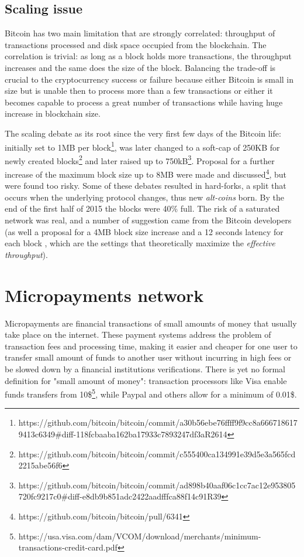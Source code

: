 		\subsection{Scaling issue}
		
		Bitcoin has two main limitation that are strongly correlated: throughput of transactions processed and disk space occupied from the blockchain. The correlation is trivial: as long as a block holds more transactions, the throughput increases and the same does the size of the block. Balancing the trade-off is crucial to the cryptocurrency success or failure because either Bitcoin is small in size but is unable then to process more than a few transactions or either it becomes capable to process a great number of transactions while having huge increase in blockchain size. 
		
		The scaling debate as its root since the very first few days of the Bitcoin life: initially set to 1MB per block\footnote{https://github.com/bitcoin/bitcoin/commit/a30b56ebe76ffff9f9cc8a6667186179413c6349\#diff-118fcbaaba162ba17933c7893247df3aR2614}, was later changed to a soft-cap of 250KB for newly created blocks\footnote{https://github.com/bitcoin/bitcoin/commit/c555400ca134991e39d5e3a565fcd2215abe56f6} and later raised up to 750kB\footnote{https://github.com/bitcoin/bitcoin/commit/ad898b40aaf06c1cc7ac12e953805720fc9217c0\#diff-e8db9b851adc2422aadfffca88f14c91R39}. Proposal for a further increase of the maximum block size up to 8MB were made and discussed\footnote{https://github.com/bitcoin/bitcoin/pull/6341}, but were found too risky. Some of these debates resulted in hard-forks, a split that occurs when the underlying protocol changes, thus new \textit{alt-coins} born.
		By the end of the first half of 2015 the blocks were 40\% full. The risk of a saturated network was real, and a number of suggestion came from the Bitcoin developers (as well a proposal for a 4MB block size increase and a 12 seconds latency for each block \cite{Croman}, which are the settings that theoretically maximize the \textit{effective throughput}). 
		
		\section{Micropayments network}
		
		Micropayments are financial transactions of small amounts of money that usually take place on the internet. These payment systems address the problem of transaction fees and processing time, making it easier and cheaper for one user to transfer small amount of funds to another user without incurring in high fees or be slowed down by a financial institutions verifications. There is yet no formal definition for "small amount of money": transaction processors like Visa enable funds transfers from 10\$\footnote{https://usa.visa.com/dam/VCOM/download/merchants/minimum-transactions-credit-card.pdf}, while Paypal and others allow for a minimum of 0.01\$. 
		
